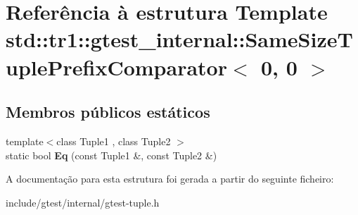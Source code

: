 \hypertarget{structstd_1_1tr1_1_1gtest__internal_1_1SameSizeTuplePrefixComparator_3_010_00_010_01_4}{\section{Referência à estrutura Template std\-:\-:tr1\-:\-:gtest\-\_\-internal\-:\-:Same\-Size\-Tuple\-Prefix\-Comparator$<$ 0, 0 $>$}
\label{structstd_1_1tr1_1_1gtest__internal_1_1SameSizeTuplePrefixComparator_3_010_00_010_01_4}
}
\subsection*{Membros públicos estáticos}
\begin{DoxyCompactItemize}
\item 
\hypertarget{structstd_1_1tr1_1_1gtest__internal_1_1SameSizeTuplePrefixComparator_3_010_00_010_01_4_a4f209822266c6bb1832c49750a11ef95}{{\footnotesize template$<$class Tuple1 , class Tuple2 $>$ }\\static bool {\bfseries Eq} (const Tuple1 \&, const Tuple2 \&)}\label{structstd_1_1tr1_1_1gtest__internal_1_1SameSizeTuplePrefixComparator_3_010_00_010_01_4_a4f209822266c6bb1832c49750a11ef95}

\end{DoxyCompactItemize}


A documentação para esta estrutura foi gerada a partir do seguinte ficheiro\-:\begin{DoxyCompactItemize}
\item 
include/gtest/internal/gtest-\/tuple.\-h\end{DoxyCompactItemize}
